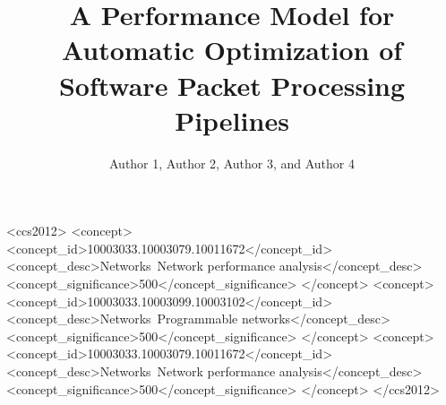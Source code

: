 \documentclass[sigconf]{acmart}
\begin{document}
\title{A Performance Model for Automatic Optimization of Software Packet Processing Pipelines}

\author{Author 1, Author 2, Author 3, and Author 4}


%
%
\begin{CCSXML}
<ccs2012>
<concept>
<concept_id>10003033.10003079.10011672</concept_id>
<concept_desc>Networks~Network performance analysis</concept_desc>
<concept_significance>500</concept_significance>
</concept>
<concept>
<concept_id>10003033.10003099.10003102</concept_id>
<concept_desc>Networks~Programmable networks</concept_desc>
<concept_significance>500</concept_significance>
</concept>
<concept>
<concept_id>10003033.10003079.10011672</concept_id>
<concept_desc>Networks~Network performance analysis</concept_desc>
<concept_significance>500</concept_significance>
</concept>
</ccs2012>
\end{CCSXML}
\maketitle






\end{document}
